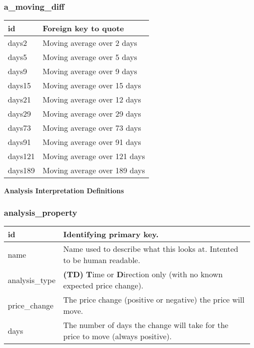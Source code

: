 \subsubsection{a\_moving\_diff}
\begin{tabular}{|l||l|}
	\hline
	id 				& Foreign key to quote \\ \hline
	days2			& Moving average over 2 days \\ \hline
	days5			& Moving average over 5 days \\ \hline
	days9			& Moving average over 9 days \\ \hline
	days15			& Moving average over 15 days \\ \hline
	days21			& Moving average over 12 days \\ \hline
	days29			& Moving average over 29 days \\ \hline
	days73			& Moving average over 73 days \\ \hline
	days91			& Moving average over 91 days \\ \hline
	days121			& Moving average over 121 days \\ \hline
	days189			& Moving average over 189 days \\ \hline
\end{tabular}

\par \textbf{Analysis Interpretation Definitions}
\subsubsection{analysis\_property}
\begin{tabular}{ |l||l| }
	\hline
	id 					& Identifying primary key. \\ \hline
	name 				& Name used to describe what this looks at. Intented to be human readable. \\ \hline
	analysis\_type 		& \textbf{(T\textbar D)} \textbf{T}ime or \textbf{D}irection only (with no known expected price change). \\ \hline
	price\_change 		& The price change (positive or negative) the price will move. \\ \hline
	days		 		& The number of days the change will take for the price to move (always positive). \\ \hline
\end{tabular}
